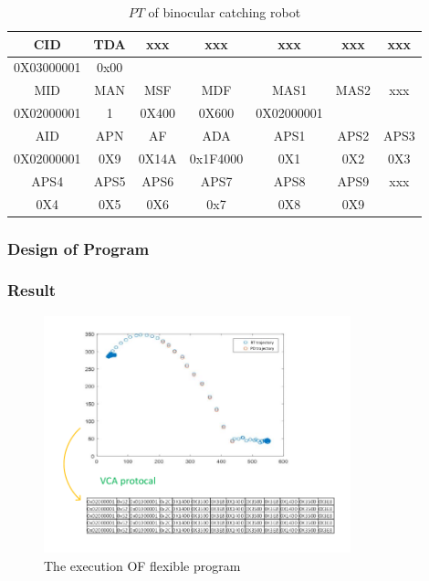 \documentclass[journal,UTF8]{IEEEtran}
\begin{document}
\begin{table}
	\scriptsize \caption{$PT$ of binocular catching robot}
	\label{table:PTofRobot}
	\begin{center}
		\renewcommand{\arraystretch}{1.4}
		\setlength\tabcolsep{3pt}
		\begin{tabular}{|c|c|c|c|c|c|c|}
			\hline
			CID  & TDA   &xxx &xxx& xxx  &xxx &xxx \\
			\hline
			0X03000001&0x00&& &&&\\
			\hline
			MID   & MAN  & MSF  & MDF  &MAS1    & MAS2&xxx\\
			\hline
			0X02000001 & 1  & 0X400  & 0X600   &0X02000001   & &\\
			\hline
			AID  & APN  & AF  &ADA  &APS1   &APS2&APS3\\
			\hline
			0X02000001 & 0X9  & 0X14A  &0x1F4000  &0X1   &0X2 &0X3\\
			\hline
			APS4  & APS5  & APS6  &APS7   &APS8   &APS9&xxx\\
			\hline
			0X4  & 0X5  & 0X6  &0x7  &0X8  &0X9&\\
			\hline
		\end{tabular}
	\end{center}
\end{table}

\subsubsection{Design of Program}

\subsubsection{Result}



\begin{figure}
	\centering
	\includegraphics[width=3.5in]{fig/PFofRobot.pdf}
	\caption{ The execution OF flexible program}
	\label{fig:settingexecutionbitinACPTD}
\end{figure}
\end{document}
